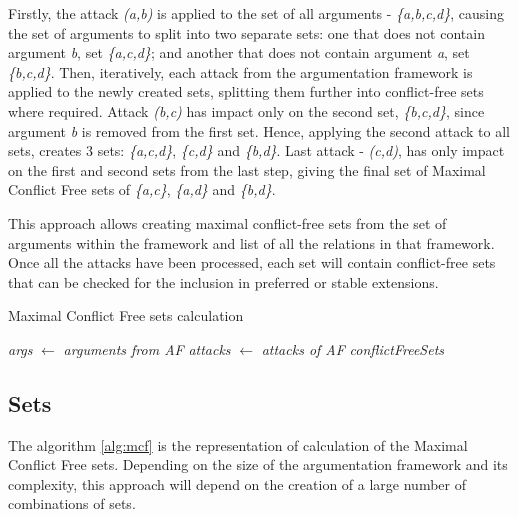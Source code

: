Firstly, the attack \textit{(a,b)} is applied to the set of all arguments - \textit{\{a,b,c,d\}}, causing the set of arguments to split into two separate sets: one that does not contain argument \textit{b}, set \textit{\{a,c,d\}}; and another that does not contain argument \textit{a}, set \textit{\{b,c,d\}}. Then, iteratively, each attack from the argumentation framework is applied to the newly created sets, splitting them further into conflict-free sets where required. Attack \textit{(b,c)} has impact only on the second set, \textit{\{b,c,d\}}, since argument \textit{b} is removed from the first set. Hence, applying the second attack to all sets, creates 3 sets: \textit{\{a,c,d\}}, \textit{\{c,d\}} and \textit{\{b,d\}}. Last attack - \textit{(c,d)}, has only impact on the first and second sets from the last step, giving the final set of Maximal Conflict Free sets of \textit{\{a,c\}}, \textit{\{a,d\}} and \textit{\{b,d\}}.

This approach allows creating maximal conflict-free sets from the set of arguments within the framework and list of all the relations in that framework. Once all the attacks have been processed, each set will contain conflict-free sets that can be checked for the inclusion in preferred or stable extensions.

\begin{algorithm}
	\caption{Maximal Conflict Free sets calculation}\label{mcfPseudocode}
	\nl \textit{args} $\gets$ \textit{arguments from AF}\;
	\nl \textit{attacks} $\gets$ \textit{attacks of AF}\;
	\nl \textit{conflictFreeSets} \;
	\nl{}
	{
	}
	\label{alg:mcf}
\end{algorithm}

\subsection{Sets}

The algorithm \ref{alg:mcf} is the representation of calculation of the Maximal Conflict Free sets. Depending on the size of the argumentation framework and its complexity, this approach will depend on the creation of a large number of combinations of sets. 

